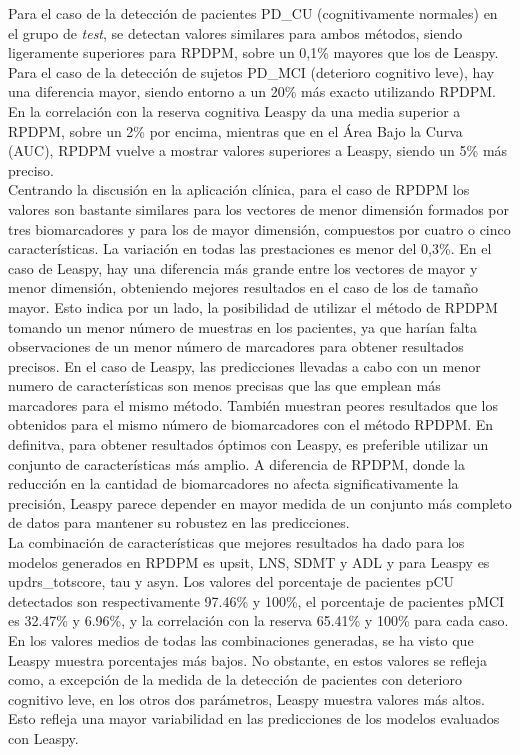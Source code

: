 Para el caso de la detección de pacientes PD\_CU (cognitivamente normales) en el grupo de \textit{test}, se detectan valores similares para ambos métodos, siendo ligeramente superiores para RPDPM, sobre un 0,1\% mayores que los de Leaspy. Para el caso de la detección de sujetos PD\_MCI (deterioro cognitivo leve), hay una diferencia mayor, siendo entorno a un 20\% más exacto utilizando RPDPM. En la correlación con la reserva cognitiva Leaspy da una media superior a RPDPM, sobre un 2\% por encima, mientras que en el Área Bajo la Curva (AUC), RPDPM vuelve a mostrar valores superiores a Leaspy, siendo un 5\% más preciso.\\

Centrando la discusión en la aplicación clínica, para el caso de RPDPM \cite{ghazi2021robust} los valores son bastante similares para los vectores de menor dimensión formados por tres biomarcadores y para los de mayor dimensión, compuestos por cuatro o cinco características. La variación en todas las prestaciones es menor del 0,3\%. En el caso de Leaspy, hay una diferencia más grande entre los vectores de mayor y menor dimensión, obteniendo mejores resultados en el caso de los de tamaño mayor. Esto indica por un lado, la posibilidad de utilizar el método de RPDPM tomando un menor número de muestras en los pacientes, ya que harían falta observaciones de un menor número de marcadores para obtener resultados precisos. En el caso de Leaspy, las predicciones llevadas a cabo con un menor numero de características son menos precisas que las que emplean más marcadores para el mismo método. También muestran peores resultados que los obtenidos para el mismo número de biomarcadores con el método RPDPM. En definitva, para obtener resultados óptimos con Leaspy, es preferible utilizar un conjunto de características más amplio. A diferencia de RPDPM, donde la reducción en la cantidad de biomarcadores no afecta significativamente la precisión, Leaspy parece depender en mayor medida de un conjunto más completo de datos para mantener su robustez en las predicciones. \\

La combinación de características que mejores resultados ha dado para los modelos generados en RPDPM es upsit, LNS, SDMT y ADL y para Leaspy es updrs\_totscore, tau y asyn. Los valores del porcentaje de pacientes pCU detectados son respectivamente 97.46\% y 100\%, el porcentaje de pacientes pMCI es 32.47\% y 6.96\%, y la correlación con la reserva 65.41\% y 100\% para cada caso. En los valores medios de todas las combinaciones generadas, se ha visto que Leaspy muestra porcentajes más bajos. No obstante, en estos valores se refleja como, a excepción de la medida de la detección de pacientes con deterioro cognitivo leve,  en los otros dos parámetros, Leaspy muestra valores más altos. Esto refleja una mayor variabilidad en las predicciones de los modelos evaluados con Leaspy.\\


